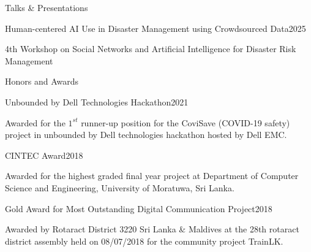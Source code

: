 \documentclass{resume} %
\begin{document}
\begin{rSection}{Talks \& Presentations}
    \begin{rSubsection}{Human-centered AI Use in Disaster Management using Crowdsourced Data}{2025}{}
        \item 4th Workshop on Social Networks and Artificial Intelligence for Disaster Risk Management
    \end{rSubsection}
\end{rSection}


\begin{rSection}{Honors and Awards}
    \begin{rSubsection}{Unbounded by Dell Technologies Hackathon}{2021}{}{}
        \item Awarded for the $1^{st}$ runner-up position for the CoviSave (COVID-19 safety) project in unbounded by Dell technologies hackathon hosted by Dell EMC.
    \end{rSubsection}

    \begin{rSubsection}{CINTEC Award}{2018}{}{}
        \item Awarded for the highest graded final year project at Department of Computer Science and Engineering, University of Moratuwa, Sri Lanka.
    \end{rSubsection}

    \begin{rSubsection}{Gold Award for Most Outstanding Digital Communication Project}{2018}{}{}
        \item Awarded by Rotaract District 3220 Sri Lanka \& Maldives at the 28th rotaract district assembly held on 08/07/2018 for the community project TrainLK.
    \end{rSubsection}
\end{rSection}
\end{document}
